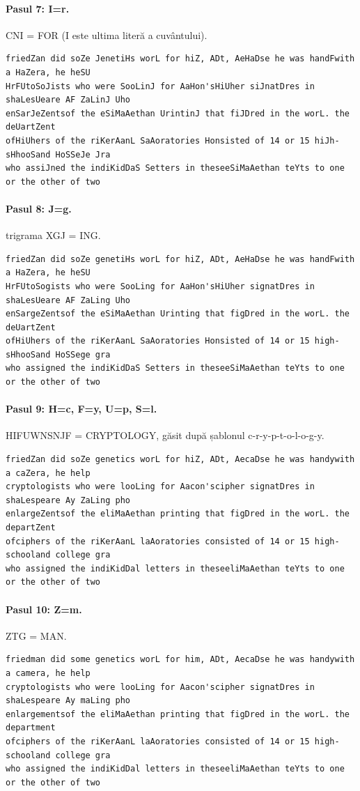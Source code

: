 \paragraph{Pasul 7: I=r.} CNI = FOR (I este ultima literă a cuvântului).
\begin{lstlisting}[language={}]
friedZan did soZe JenetiHs worL for hiZ, ADt, AeHaDse he was handFwith a HaZera, he heSU
HrFUtoSoJists who were SooLinJ for AaHon'sHiUher siJnatDres in shaLesUeare AF ZaLinJ Uho
enSarJeZentsof the eSiMaAethan UrintinJ that fiJDred in the worL. the deUartZent
ofHiUhers of the riKerAanL SaAoratories Honsisted of 14 or 15 hiJh-sHhooSand HoSSeJe Jra
who assiJned the indiKidDaS Setters in theseeSiMaAethan teYts to one or the other of two
\end{lstlisting}

\paragraph{Pasul 8: J=g.} trigrama XGJ = ING.
\begin{lstlisting}[language={}]
friedZan did soZe genetiHs worL for hiZ, ADt, AeHaDse he was handFwith a HaZera, he heSU
HrFUtoSogists who were SooLing for AaHon'sHiUher signatDres in shaLesUeare AF ZaLing Uho
enSargeZentsof the eSiMaAethan Urinting that figDred in the worL. the deUartZent
ofHiUhers of the riKerAanL SaAoratories Honsisted of 14 or 15 high-sHhooSand HoSSege gra
who assigned the indiKidDaS Setters in theseeSiMaAethan teYts to one or the other of two
\end{lstlisting}

\paragraph{Pasul 9: H=c, F=y, U=p, S=l.} HIFUWNSNJF = CRYPTOLOGY, găsit după șablonul c-r-y-p-t-o-l-o-g-y.
\begin{lstlisting}[language={}]
friedZan did soZe genetics worL for hiZ, ADt, AecaDse he was handywith a caZera, he help
cryptologists who were looLing for Aacon'scipher signatDres in shaLespeare Ay ZaLing pho
enlargeZentsof the eliMaAethan printing that figDred in the worL. the departZent
ofciphers of the riKerAanL laAoratories consisted of 14 or 15 high-schooland college gra
who assigned the indiKidDal letters in theseeliMaAethan teYts to one or the other of two
\end{lstlisting}

\paragraph{Pasul 10: Z=m.} ZTG = MAN.
\begin{lstlisting}[language={}]
friedman did some genetics worL for him, ADt, AecaDse he was handywith a camera, he help
cryptologists who were looLing for Aacon'scipher signatDres in shaLespeare Ay maLing pho
enlargementsof the eliMaAethan printing that figDred in the worL. the department
ofciphers of the riKerAanL laAoratories consisted of 14 or 15 high-schooland college gra
who assigned the indiKidDal letters in theseeliMaAethan teYts to one or the other of two
\end{lstlisting}

